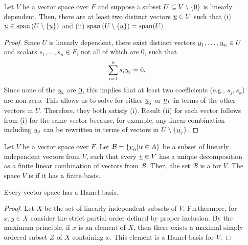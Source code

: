 \begin{lemma}
Let $V$ be a vector space over $F$ and suppose a subset $U \subseteq V \setminus \{ \underline{0} \}$ is linearly dependent.
Then, there are at least two distinct vectors $\underline{u} \in U$ such that (i) $\underline{u} \in \mathrm{span} \left(U \setminus  \{\underline{u} \}\right)$ and (ii) $\mathrm{span} \left( U \setminus \{\underline{u} \}\right) = \mathrm{span}(U)$.
\end{lemma}
\begin{proof}
Since $U$ is linearly dependent, there exist distinct vectors $\underline{u}_1, \ldots, \underline{u}_n \in U$ and scalars $s_1, \ldots, s_n \in F$, not all of which are $0$, such that
\begin{equation*}
\sum_{i=1}^n s_i \underline{u}_i = 0.
\end{equation*}
Since none of the $\underline{u}_i$ are $\underline{0}$, this implies that at least two coefficients (e.g., $s_j,s_k$) are non-zero.
This allows us to solve for either $\underline{u}_j$ or $\underline{u}_k$ in terms of the other vectors in $U$.
Therefore, they both satisfy (i).
Result (ii) for each vector follows from (i) for the same vector because, for example, any linear combination including $\underline{u}_j$ can be rewritten in terms of vectors in $U \setminus  \{\underline{u}_j \}$.
\end{proof}

\fi

\begin{definition}
Let $V$ be a vector space over $F$.
Let $\mathcal{B} = \left\{ \underline{v}_{\alpha} | \alpha \in A \right\}$ be a subset of linearly independent vectors from $V$, such that every $\underline{v} \in V$ has a unique decomposition as a finite linear combination of vectors from $\mathcal{B}$.
Then, the set $\mathcal{B}$ is a  for $V$.
The space $V$ is  if it has a finite basis.
\end{definition}

\begin{theorem}
Every vector space has a Hamel basis.
\end{theorem}
\begin{proof}
Let $X$ be the set of linearly independent subsets of $V$.
Furthermore, for $x, y \in X$ consider the strict partial order defined by proper inclusion.
By the maximum principle, if $x$ is an element of $X$, then there exists a maximal simply ordered subset $Z$ of $X$ containing $x$.
This element is a Hamel basis for $V$.
\end{proof}

